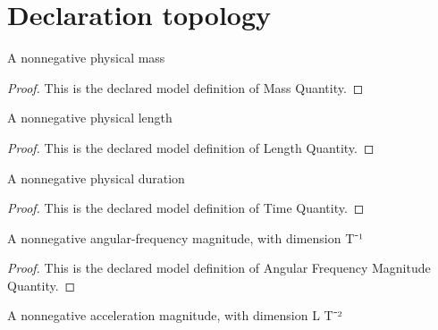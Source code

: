 \section{Declaration topology}
\begin{definition}
  \label{def:physics:phyx-mini-0263:phyxminiproblems-problemphyxmini0263-massquantity}
  A nonnegative physical mass
\end{definition}
\begin{proof}
  This is the declared model definition of Mass Quantity.
\end{proof}
\begin{definition}
  \label{def:physics:phyx-mini-0263:phyxminiproblems-problemphyxmini0263-lengthquantity}
  A nonnegative physical length
\end{definition}
\begin{proof}
  This is the declared model definition of Length Quantity.
\end{proof}
\begin{definition}
  \label{def:physics:phyx-mini-0263:phyxminiproblems-problemphyxmini0263-timequantity}
  A nonnegative physical duration
\end{definition}
\begin{proof}
  This is the declared model definition of Time Quantity.
\end{proof}
\begin{definition}
  \label{def:physics:phyx-mini-0263:phyxminiproblems-problemphyxmini0263-angularfrequencymagnitudequantity}
  A nonnegative angular-frequency magnitude, with dimension T⁻¹
\end{definition}
\begin{proof}
  This is the declared model definition of Angular Frequency Magnitude Quantity.
\end{proof}
\begin{definition}
  \label{def:physics:phyx-mini-0263:phyxminiproblems-problemphyxmini0263-accelerationmagnitudequantity}
  A nonnegative acceleration magnitude, with dimension L T⁻²
\end{definition}
